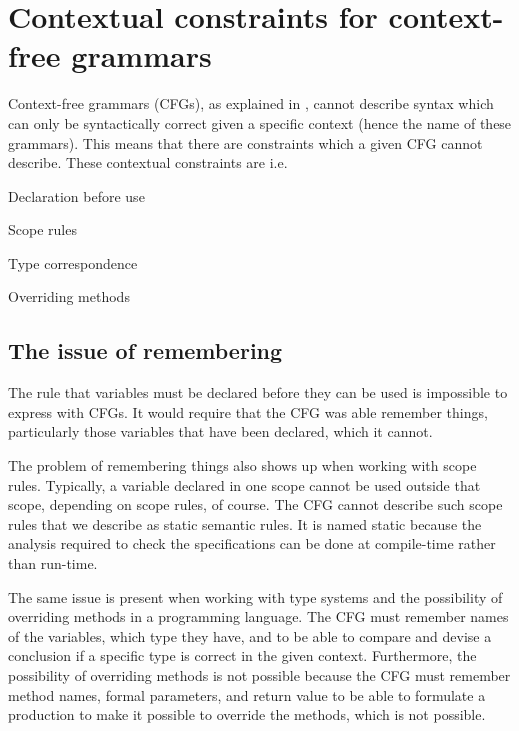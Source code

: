 \section{Contextual constraints for context-free grammars}
\label{sec:contextualconstraints}

Context-free grammars (CFGs), as explained in , cannot describe syntax which can only be
syntactically correct given a specific context (hence the name of these
grammars). This means that there are constraints which a given CFG cannot
describe.
These contextual constraints are i.e.\:
\cite[p. 39]{plpp}

\begin{dlist}
\item Declaration before use
\item Scope rules
\item Type correspondence
\item Overriding methods
\end{dlist}


\subsection{The issue of remembering}

The rule that variables must be declared before they can be used is impossible
to express with CFGs. It would require that the CFG was able remember things,
particularly those variables that have been declared, which it cannot. 

The problem of remembering things also shows up when working with
scope rules. Typically, a variable declared in one scope cannot be
used outside that scope, depending on scope rules, of course. The CFG
cannot describe such scope rules that we describe as static semantic
rules. It is named static because the analysis required to check the
specifications can be done at compile-time rather than run-time.
\cite[p. 153]{sebesta2013}

The same issue is present when working with type systems and the
possibility of overriding methods in a programming language. The CFG
must remember names of the variables, which type they have, and to be
able to compare and devise a conclusion if a specific type is correct in
the given context. Furthermore, the possibility of overriding methods
is not possible because the CFG must remember method names, formal
parameters, and return value to be able to formulate a production to
make it possible to override the methods, which is not possible.

